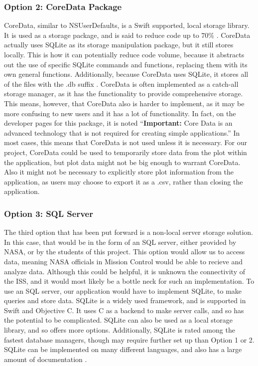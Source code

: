 \documentclass[onecolumn, draftclsnofoot,10pt, compsoc]{IEEEtran}
\begin{document}
\subsubsection{Option 2: CoreData Package}
CoreData, similar to NSUserDefaults, is a Swift supported, local storage library.
It is used as a storage package, and is said to reduce code up to 70\% \cite{coreApple}.
CoreData actually uses SQLite as its storage manipulation package, but it still stores locally.
This is how it can potentially reduce code volume, because it abstracts out the use of specific SQLite commands and functions, replacing them with its own general functions.
Additionally, because CoreData uses SQLite, it stores all of the files with the .db suffix \cite{storeoptions}.
CoreData is often implemented as a catch-all storage manager, as it has the functionality to provide comprehensive storage.
This means, however, that CoreData also is harder to implement, as it may be more confusing to new users and it has a lot of functionality.
In fact, on the developer pages for this package, it is noted ``\textbf{Important:} Core Data is an advanced technology that is not required for creating simple applications.''\cite{coreApple2}
In most cases, this means that CoreData is not used unless it is necessary.
For our project, CoreData could be used to temporarily store data from the plot within the application, but plot data might not be big enough to warrant CoreData.
Also it might not be necessary to explicitly store plot information from the application, as users may choose to export it as a .csv, rather than closing the application.

\subsubsection{Option 3: SQL Server}
The third option that has been put forward is a non-local server storage solution.
In this case, that would be in the form of an SQL server, either provided by NASA, or by the students of this project.
This option would allow us to access data, meaning NASA officials in Mission Control would be able to recieve and analyze data.
Although this could be helpful, it is unknown the connectivity of the ISS, and it would most likely be a bottle neck for such an implementation.
To use an SQL server, our application would have to implement SQLite, to make queries and store data.
SQLite is a widely used framework, and is supported in Swift and Objective C.
It uses C as a backend to make server calls, and so has the potential to be complicated.
SQLite can also be used as a local storage library, and so offers more options.
Additionally, SQLite is rated among the fastest database managers, though may require further set up than Option 1 or 2.
SQLite can be implemented on many different languages, and also has a large amount of documentation \cite{sqlite}.
\end{document}
